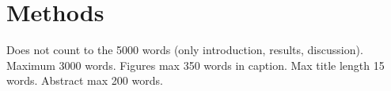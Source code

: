 \documentclass[pdflatex,sn-mathphys-num]{sn-jnl}%
\theoremstyle{thmstyleone}%
\theoremstyle{thmstyletwo}%
\theoremstyle{thmstylethree}%
\newcommand{\blue}[1]{\textcolor{blue}{#1}}
\begin{document}




\section{Methods}
{\color{gray} Does not count to the 5000 words (only introduction, results, discussion). Maximum 3000 words. Figures max 350 words in caption. Max title length 15 words. Abstract max 200 words.}
\end{document}
